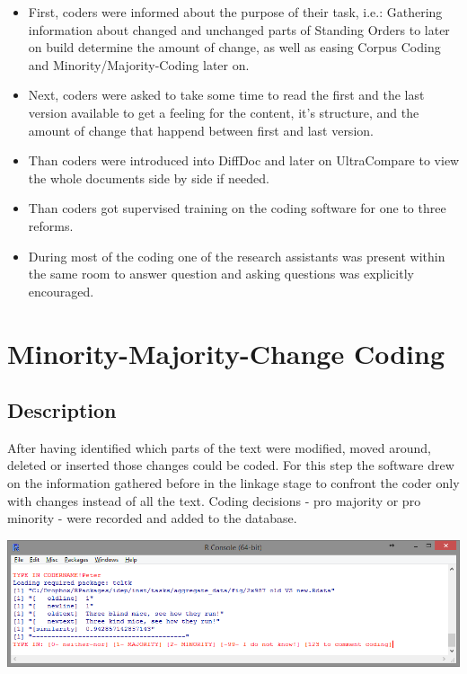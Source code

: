 \documentclass[10pt,]{article}
\providecommand{\tightlist}{%
  \setlength{\itemsep}{0pt}\setlength{\parskip}{0pt}}
\begin{document}
\begin{itemize}
\tightlist
\item
  First, coders were informed about the purpose of their task, i.e.:
  Gathering information about changed and unchanged parts of Standing
  Orders to later on build determine the amount of change, as well as
  easing Corpus Coding and Minority/Majority-Coding later on.
\item
  Next, coders were asked to take some time to read the first and the
  last version available to get a feeling for the content, it's
  structure, and the amount of change that happend between first and
  last version.
\item
  Than coders were introduced into DiffDoc and later on UltraCompare to
  view the whole documents side by side if needed.
\item
  Than coders got supervised training on the coding software for one to
  three reforms.
\item
  During most of the coding one of the research assistants was present
  within the same room to answer question and asking questions was
  explicitly encouraged.
\end{itemize}

\newpage

\section{Minority-Majority-Change
Coding}\label{minority-majority-change-coding}

\subsection{Description}\label{description-1}

After having identified which parts of the text were modified, moved
around, deleted or inserted those changes could be coded. For this step
the software drew on the information gathered before in the linkage
stage to confront the coder only with changes instead of all the text.
Coding decisions - pro majority or pro minority - were recorded and
added to the database.

\begin{center}
\includegraphics[width=\textwidth]{fig/minmaj.png}
\end{center}
\end{document}
